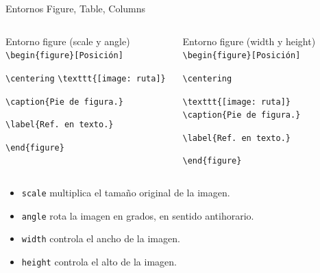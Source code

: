 \documentclass[aspectratio=169, 10pt]{beamer}
\begin{document}
\begin{frame}[fragile]{Entornos Figure, Table, Columns}
    \begin{columns}\pause

    \begin{column}{.52\linewidth}        
    \begin{block}{Entorno figure (scale y angle)}
        \verb|\begin{figure}[Posición]|
        
                \verb|\centering|
                \verb|\texttt{[image: ruta]}|

                \verb|\caption{Pie de figura.}|
                
                \verb|\label{Ref. en texto.}|
                
        \verb|\end{figure}|

    \end{block}    
    \end{column}

        \begin{column}{.52\linewidth}        
    \begin{block}{Entorno figure (width y height)}
        \verb|\begin{figure}[Posición]|
        
                \verb|\centering|

                \verb|\texttt{[image: ruta]}|
                \verb|\caption{Pie de figura.}|
                
                \verb|\label{Ref. en texto.}|
                
        \verb|\end{figure}|

    \end{block}    
    \end{column}


    
    \end{columns}

\begin{itemize}
    \item \verb|scale| multiplica el tamaño original de la imagen.
    \item \verb|angle| rota la imagen en grados, en sentido antihorario.

\pause
    \item \verb|width| controla el ancho de la imagen.

    \item \verb|height| controla el alto de la imagen.

\end{itemize}    
\end{frame}
\end{document}
